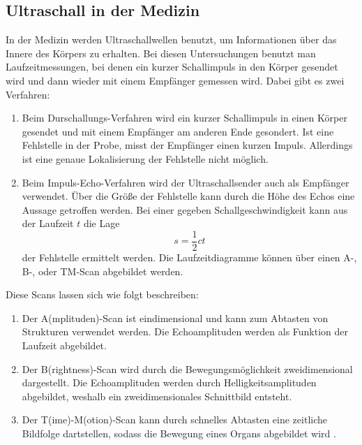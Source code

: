 \subsection{Ultraschall in der Medizin}
In der Medizin werden Ultraschallwellen benutzt, um Informationen über das Innere des Körpers zu erhalten. Bei diesen Untersuchungen benutzt man Laufzeitmessungen, bei denen ein kurzer Schallimpuls in den Körper gesendet wird und dann wieder mit einem Empfänger gemessen wird. Dabei gibt es zwei Verfahren:\\
\begin{enumerate}[nosep,label=\textsc{\arabic*},leftmargin=*]
\item Beim Durschallungs-Verfahren wird ein kurzer Schallimpuls in einen Körper gesendet und mit einem Empfänger am anderen Ende gesondert. Ist eine Fehlstelle in der Probe, misst der Empfänger einen kurzen Impuls. Allerdings ist eine genaue Lokalisierung der Fehlstelle nicht möglich.
\item Beim Impuls-Echo-Verfahren wird der Ultraschallsender auch als Empfänger verwendet. Über die Größe der Fehlstelle kann durch die Höhe des Echos  eine Aussage getroffen werden. Bei einer gegeben Schallgeschwindigkeit kann aus der Laufzeit $t$ die Lage
\begin{equation*}
  s=\frac{1}{2}ct
\end{equation*}
der Fehlstelle ermittelt werden. Die Laufzeitdiagramme können über einen A-, B-, oder TM-Scan abgebildet werden.
\end{enumerate}
Diese Scans lassen sich wie folgt beschreiben:
\begin{enumerate}[nosep,label=\textsc{\arabic*},leftmargin=*]
\item Der A(mplituden)-Scan ist eindimensional und kann zum Abtasten von Strukturen verwendet werden. Die Echoamplituden werden als Funktion der Laufzeit abgebildet.
\item Der B(rightness)-Scan wird durch die Bewegungsmöglichkeit zweidimensional dargestellt. Die Echoamplituden werden durch Helligkeitsamplituden abgebildet, weshalb ein zweidimensionales Schnittbild entsteht. 
\item Der T(ime)-M(otion)-Scan kann durch schnelles Abtasten eine zeitliche Bildfolge dartstellen, sodass die Bewegung eines Organs abgebildet wird \cite{1}. 
\end{enumerate}

